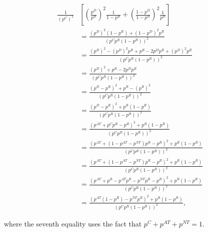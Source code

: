 \documentclass[]{book}
\theoremstyle{definition}
\theoremstyle{definition}
\theoremstyle{definition}
\theoremstyle{remark}
\begin{document}
\begin{align*}
\frac{1}{(p^C)^2} &  \left[\left(\frac{p^D}{p^R}\right)^2\frac{1}{1-p^R}+\left(\frac{1-p^D}{1-p^R}\right)^2\frac{1}{p^R}\right]\\
  & = \frac{(p^D)^2(1-p^R)+(1-p^D)^2p^R}{(p^Cp^R(1-p^R))^2} \\
  & = \frac{(p^D)^2-(p^D)^2p^R+p^R-2p^Dp^R+(p^D)^2p^R}{(p^Cp^R(1-p^R))^2} \\
  & = \frac{(p^D)^2+p^R-2p^Dp^R}{(p^Cp^R(1-p^R))^2} \\
  & = \frac{(p^D-p^R)^2+p^R-(p^R)^2}{(p^Cp^R(1-p^R))^2} \\
  & = \frac{(p^D-p^R)^2+p^R(1-p^R)}{(p^Cp^R(1-p^R))^2} \\
  & = \frac{(p^{AT}+p^Cp^R-p^R)^2+p^R(1-p^R)}{(p^Cp^R(1-p^R))^2} \\
  & = \frac{(p^{AT}+(1-p^{AT}-p^{NT})p^R-p^R)^2+p^R(1-p^R)}{(p^Cp^R(1-p^R))^2} \\
  & = \frac{(p^{AT}+(1-p^{AT}-p^{NT})p^R-p^R)^2+p^R(1-p^R)}{(p^Cp^R(1-p^R))^2} \\
  & = \frac{(p^{AT}+p^R-p^{AT}p^R-p^{NT}p^R-p^R)^2+p^R(1-p^R)}{(p^Cp^R(1-p^R))^2} \\
  & = \frac{(p^{AT}(1-p^R)-p^{NT}p^R)^2+p^R(1-p^R)}{(p^Cp^R(1-p^R))^2},
\end{align*}

where the seventh equality uses the fact that \(p^C+p^{AT}+p^{NT}=1\).
\end{document}
